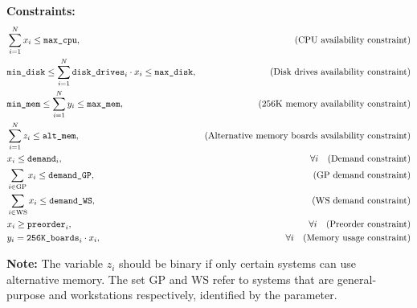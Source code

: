 \documentclass{article}
\begin{document}
\textbf{Constraints:}
\begin{align*}
    & \sum_{i=1}^{N} x_i \leq \text{\texttt{max\_cpu}}, & \text{(CPU availability constraint)} \\
    & \text{\texttt{min\_disk}} \leq \sum_{i=1}^{N} \text{\texttt{disk\_drives}}_i \cdot x_i \leq \text{\texttt{max\_disk}}, & \text{(Disk drives availability constraint)} \\
    & \text{\texttt{min\_mem}} \leq \sum_{i=1}^{N} y_i \leq \text{\texttt{max\_mem}}, & \text{(256K memory availability constraint)} \\
    & \sum_{i=1}^{N} z_i \leq \text{\texttt{alt\_mem}}, & \text{(Alternative memory boards availability constraint)} \\
    & x_i \leq \text{\texttt{demand}}_i, & \forall i \quad \text{(Demand constraint)} \\
    & \sum_{i \in \text{GP}} x_i \leq \text{\texttt{demand\_GP}}, & \text{(GP demand constraint)} \\
    & \sum_{i \in \text{WS}} x_i \leq \text{\texttt{demand\_WS}}, & \text{(WS demand constraint)} \\
    & x_i \geq \text{\texttt{preorder}}_i, & \forall i \quad \text{(Preorder constraint)} \\
    & y_i = \text{\texttt{256K\_boards}}_i \cdot x_i, & \forall i \quad \text{(Memory usage constraint)} \\
\end{align*}

\textbf{Note:} The variable \( z_i \) should be binary if only certain systems can use alternative memory. The set \(\text{GP}\) and \(\text{WS}\) refer to systems that are general-purpose and workstations respectively, identified by the  parameter.
\end{document}
